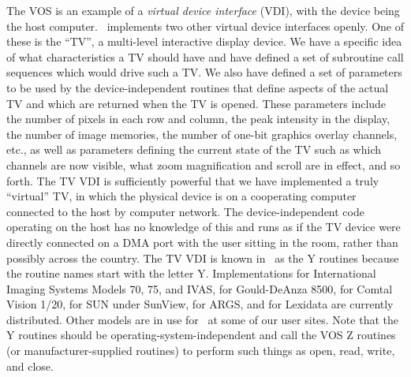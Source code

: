      The VOS is an example of a {\it virtual device interface} (VDI),
with the device being the host computer.  \AIPS\ implements two other
virtual device interfaces openly.  One of these is the ``TV'',
a multi-level interactive display device.  We have a specific idea
of what characteristics a TV should have and have defined a set of
subroutine call sequences which would drive such a \hbox{TV}.  We also
have defined a set of parameters to be used by the device-independent
routines that define aspects of the actual TV and which are
returned when the TV is opened.  These parameters include the
number of pixels in each row and column, the peak intensity
in the display, the number of image memories, the number of
one-bit graphics overlay channels, etc., as well as parameters
defining the current state of the TV such as which channels
are now visible, what zoom magnification and scroll are in
effect, and so forth.  The TV VDI is sufficiently powerful that
we have implemented a truly ``virtual'' TV, in which the physical
device is on a cooperating computer connected to the host by
computer network.  The device-independent code operating on the
host has no knowledge of this and runs as if the TV device were
directly connected on a DMA port with the user sitting in the room,
rather than possibly across the country.  The TV VDI is known in
\AIPS\ as the Y routines because the routine names %
start with the letter \hbox{Y}.  Implementations for International
Imaging Systems Models 70, 75, and IVAS, for Gould-DeAnza 8500, for
Comtal Vision 1/20, for SUN under SunView, for ARGS, and for
Lexidata are currently distributed.  Other models are in use
for \AIPS\ at some of our user sites.  Note that the Y routines
should be operating-system-independent and call the VOS Z
routines (or manufacturer-supplied routines) to perform such
things as open, read, write, and close.

